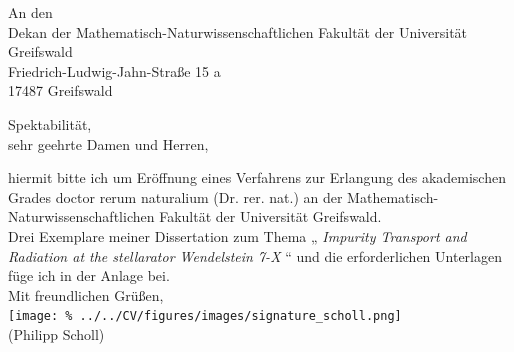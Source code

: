 \documentclass[
  fontsize=11pt,
  paper=a4,
  fromalign=right,         %
  fromrule=off,            %
  addrfield=on,            %
  backaddress=off,         %
  foldmarks=on             %
]{scrlttr2}
\newcommand{\thesistitle}{%
    \textit{%
        Impurity Transport and Radiation at the stellarator Wendelstein 7-X%
    }%
}
\begin{document}
\begin{letter}{%
    An den\\%
    Dekan der Mathematisch-Naturwissenschaftlichen Fakultät der Universität Greifswald\\%
    Friedrich-Ludwig-Jahn-Straße 15 a\\%
    17487 Greifswald
}%
  \opening{%
    Spektabilität,\\%
    sehr geehrte Damen und Herren,%
}%
    hiermit bitte ich um Eröffnung eines Verfahrens zur Erlangung des akademischen Grades doctor rerum naturalium (Dr. rer. nat.) an der Mathematisch-Naturwissenschaftlichen Fakultät der Universität Greifswald.\\[0.5cm]
%
    Drei Exemplare meiner Dissertation zum Thema „\thesistitle“ und die erforderlichen Unterlagen füge ich in der Anlage bei.\\[0.5cm]
%
  Mit freundlichen Grüßen,\\[.5cm]%
  \texttt{[image: \%
    ../../CV/figures/images/signature\_scholl.png]}\\[-0.5cm]%
  (Philipp Scholl)%
%
\end{letter}
\end{document}
